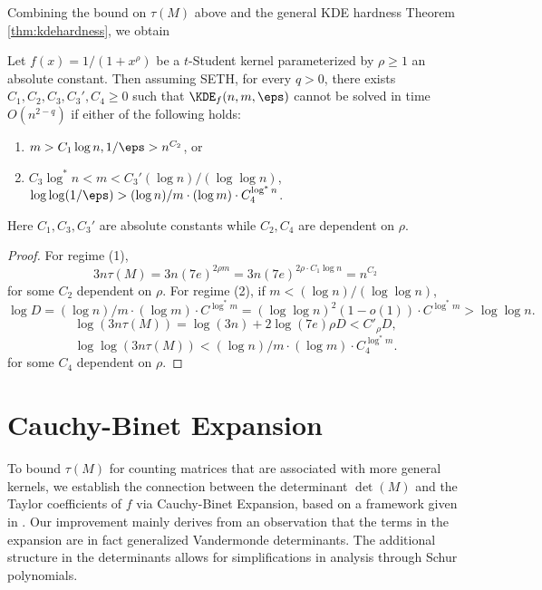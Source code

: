 Combining the bound on $\tau(M)$ above and the general KDE hardness Theorem \ref{thm:kdehardness}, we obtain
\begin{theorem}
Let $f(x) = 1/(1+x^\rho)$ be a $t$-Student kernel parameterized by $\rho \ge 1$ an absolute constant.
Then assuming SETH, for every $q > 0$, there exists $C_1, C_2, C_3, C_3', C_4 \ge 0$ such that $\KDE_f(n, m, \eps)$ cannot be solved in time $O(n^{2-q})$ if either of the following holds:
\begin{enumerate}[(1)]
\item $m > C_1\log n, 1/\eps > n^{C_2}$, or
\item $C_3\log^* n < m < C_3'(\log n)/(\log\log n)$, $\log\log(1/\eps) > (\log n)/m \cdot (\log m) \cdot C_4^{\log^*n}$.
\end{enumerate}
Here $C_1, C_3, C_3'$ are absolute constants while $C_2, C_4$ are dependent on $\rho$.
\end{theorem}
\begin{proof}
For regime (1), 
\[3n\tau(M) = 3n(7e)^{2\rho m} = 3n(7e)^{2\rho \cdot C_1\log n} = n^{C_2}\]
for some $C_2$ dependent on $\rho$. For regime (2), if $m < (\log n)/(\log \log n)$,
\[\log D = (\log n)/m \cdot (\log m) \cdot C^{\log^* m}
= (\log\log n)^2(1 - o(1)) \cdot C^{\log^* m} > \log \log n.\]
\[\log(3n\tau(M)) = \log(3n) + 2\log(7e)\rho D < C'_\rho D,\]
\[\log\log(3n\tau(M)) < (\log n)/m \cdot (\log m) \cdot C_4^{\log^* m}.\]
for some $C_4$ dependent on $\rho$.
\end{proof}

\section{Cauchy-Binet Expansion} \label{sec:cauchybinet}
To bound $\tau(M)$ for counting matrices that are associated with more general kernels, we establish the connection between the determinant $\det(M)$ and the Taylor coefficients of $f$ via Cauchy-Binet Expansion, based on a framework given in \cite{ACSS20}. Our improvement mainly derives from an observation that the terms in the expansion are in fact generalized Vandermonde determinants. The additional structure in the determinants allows for simplifications in analysis through Schur polynomials.

